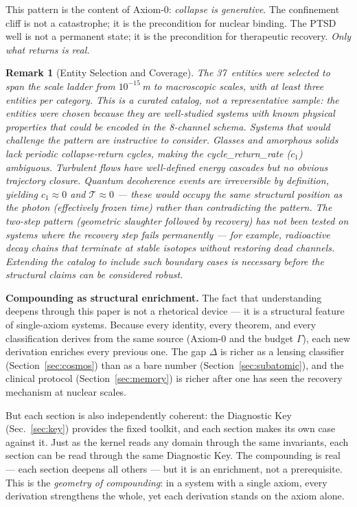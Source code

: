 \documentclass[
  aps,
  prd,
  twocolumn,
  superscriptaddress,
  nofootinbib,
  floatfix
]{revtex4-2}
\newtheorem{remark}{Remark}
\newcommand{\Gam}{\Gamma}
\begin{document}
This pattern is the content of Axiom-0: \emph{collapse is
generative}.  The confinement cliff is not a catastrophe;
it is the precondition for nuclear binding.  The PTSD well
is not a permanent state; it is the precondition for
therapeutic recovery.  \emph{Only what returns is real.}

\begin{remark}[Entity Selection and Coverage]
\label{rem:selection}
The 37~entities were selected to span the scale ladder from
$10^{-15}$\,m to macroscopic scales, with at least three
entities per category.  This is a \emph{curated catalog},
not a representative sample: the entities were chosen because
they are well-studied systems with known physical properties
that could be encoded in the 8-channel schema.  Systems that
would challenge the pattern are instructive to consider.
Glasses and amorphous solids lack periodic collapse-return
cycles, making the cycle\_return\_rate ($c_1$) ambiguous.
Turbulent flows have well-defined energy cascades but no
obvious trajectory closure.  Quantum decoherence events are
irreversible by definition, yielding $c_1 \approx 0$ and
$\mathcal{T} \approx 0$ --- these would occupy the same
structural position as the photon (effectively frozen time)
rather than contradicting the pattern.  The two-step pattern
(geometric slaughter followed by recovery) has not been
tested on systems where the recovery step fails permanently
--- for example, radioactive decay chains that terminate at
stable isotopes without restoring dead channels.  Extending
the catalog to include such boundary cases is necessary
before the structural claims can be considered robust.
\end{remark}

\textbf{Compounding as structural enrichment.}
The fact that understanding deepens through this paper is
not a rhetorical device --- it is a structural feature of
single-axiom systems.  Because every identity, every theorem,
and every classification derives from the same source
(Axiom-0 and the budget $\Gam$), each new derivation enriches
every previous one.  The gap $\Delta$ is richer as a lensing
classifier (Section~\ref{sec:cosmos}) than as a bare number
(Section~\ref{sec:subatomic}), and the clinical protocol
(Section~\ref{sec:memory}) is richer after one has seen the
recovery mechanism at nuclear scales.

But each section is also independently coherent: the
Diagnostic Key (Sec.~\ref{sec:key}) provides the fixed
toolkit, and each section makes its own case against it.
Just as the kernel reads any domain through the same
invariants, each section can be read through the same
Diagnostic Key.  The compounding is real --- each section
deepens all others --- but it is an enrichment, not a
prerequisite.  This is the \emph{geometry of
compounding}: in a system with a single axiom, every
derivation strengthens the whole, yet each derivation
stands on the axiom alone.
\end{document}
